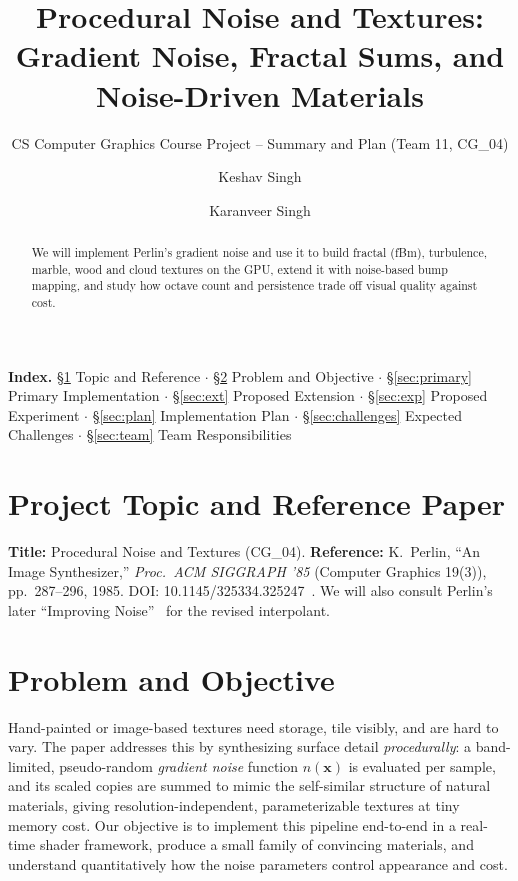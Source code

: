 \documentclass[acmlarge,nonacm]{acmart}
\begin{document}
\title{Procedural Noise and Textures: Gradient Noise, Fractal Sums, and Noise-Driven Materials}
\subtitle{CS Computer Graphics Course Project -- Summary and Plan (Team 11, CG\_04)}

\author{Keshav Singh}

\author{Karanveer Singh}

\begin{abstract}
We will implement Perlin's gradient noise and use it to build fractal (fBm), turbulence, marble, wood and cloud textures on the GPU, extend it with noise-based bump mapping, and study how octave count and persistence trade off visual quality against cost.
\end{abstract}

\maketitle

\noindent\textbf{Index.}\;
\S\ref{sec:topic} Topic and Reference $\cdot$
\S\ref{sec:problem} Problem and Objective $\cdot$
\S\ref{sec:primary} Primary Implementation $\cdot$
\S\ref{sec:ext} Proposed Extension $\cdot$
\S\ref{sec:exp} Proposed Experiment $\cdot$
\S\ref{sec:plan} Implementation Plan $\cdot$
\S\ref{sec:challenges} Expected Challenges $\cdot$
\S\ref{sec:team} Team Responsibilities

\section{Project Topic and Reference Paper}\label{sec:topic}
\textbf{Title:} Procedural Noise and Textures (CG\_04). \textbf{Reference:} K.~Perlin, ``An Image Synthesizer,'' \emph{Proc.\ ACM SIGGRAPH '85} (Computer Graphics 19(3)), pp.~287--296, 1985. DOI: 10.1145/325334.325247~\cite{perlin1985}. We will also consult Perlin's later ``Improving Noise''~\cite{perlin2002} for the revised interpolant.

\section{Problem and Objective}\label{sec:problem}
Hand-painted or image-based textures need storage, tile visibly, and are hard to vary. The paper addresses this by synthesizing surface detail \emph{procedurally}: a band-limited, pseudo-random \emph{gradient noise} function $n(\mathbf{x})$ is evaluated per sample, and its scaled copies are summed to mimic the self-similar structure of natural materials, giving resolution-independent, parameterizable textures at tiny memory cost. Our objective is to implement this pipeline end-to-end in a real-time shader framework, produce a small family of convincing materials, and understand quantitatively how the noise parameters control appearance and cost.
\end{document}
